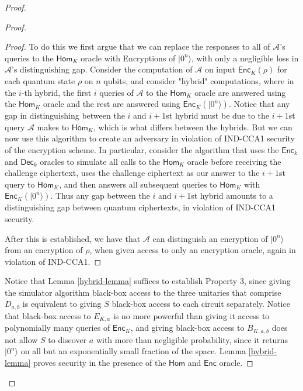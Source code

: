 \documentclass[11pt]{article}
\numberwithin{equation}{section}
\newcommand{\algo}{\mathcal}
\newcommand{\Enc}{\ensuremath{\mathsf{Enc}}\xspace}
\newcommand{\Dec}{\ensuremath{\mathsf{Dec}}\xspace}
\newcommand{\Homorcl}{\ensuremath{\mathsf{Hom}}\xspace}
\begin{document}
{\begin{proof}
\begin{proof}
\begin{proof}
To do this we first argue that we can replace the responses to all of $\algo{A}$'s queries to the $\Homorcl_K$ oracle with Encryptions of $|0^n\rangle$, with only a negligible loss in $\algo{A}$'s distinguishing gap.  Consider the computation of $\algo{A}$ on input $\Enc_K(\rho)$ for each quantum state $\rho$ on $n$ qubits, and consider "hybrid" computations, where in the $i$-th hybrid, the first $i$ queries of $\algo{A}$ to the $\Homorcl_K$ oracle are answered using the $\Homorcl_K$ oracle and the rest are answered using $\Enc_K(|0^n\rangle)$.  Notice that any gap in distinguishing between the $i$ and $i+1$st hybrid must be due to the $i+1$st query $\algo{A}$ makes to $\Homorcl_K$, which is what differs between the hybrids. But we can now use this algorithm to create an adversary in violation of IND-CCA1 security of the encryption scheme.  In particular, consider the algorithm that uses the $\Enc_k$ and $\Dec_k$ oracles to simulate all calls to the $\Homorcl_K$ oracle before receiving the challenge ciphertext, uses the challenge ciphertext as our answer to the $i+1$st query to $\Homorcl_K$, and then answers all subsequent queries to $\Homorcl_K$ with $\Enc_K(|0^n\rangle)$.  Thus any gap between the $i$ and $i+1$st hybrid amounts to a distinguishing gap between quantum ciphertexts, in violation of IND-CCA1 security.

After this is established, we have that $\algo{A}$ can distinguish an encryption of $|0^n\rangle$ from an encryption of $\rho$, when given access to only an encryption oracle, again in violation of IND-CCA1. 
\end{proof}
Notice that Lemma \ref{hybrid-lemma} suffices to establish Property 3, since giving the simulator algorithm black-box access to the three unitaries that comprise $D_{a,b}$ is equivalent to giving $S$ black-box access to each circuit separately.  Notice that black-box access to  $E_{K,a}$ is no more powerful than giving it access to polynomially many queries of $\Enc_{K}$, and giving black-box access to $B_{K,a,b}$ does not allow $S$ to discover $a$ with more than negligible probability, since it returns $|0^n\rangle$ on all but an exponentially small fraction of the space.  Lemma \ref{hybrid-lemma} proves security in the presence of the $\Homorcl$ and $\Enc$ oracle.
\end{proof}


\end{proof}}
\end{document}
